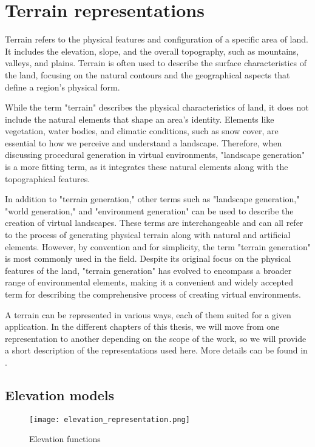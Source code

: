\section{Terrain representations}
Terrain refers to the physical features and configuration of a specific area of land. It includes the elevation, slope, and the overall topography, such as mountains, valleys, and plains. Terrain is often used to describe the surface characteristics of the land, focusing on the natural contours and the geographical aspects that define a region's physical form.

While the term "terrain" describes the physical characteristics of land, it does not include the natural elements that shape an area's identity. Elements like vegetation, water bodies, and climatic conditions, such as snow cover, are essential to how we perceive and understand a landscape. Therefore, when discussing procedural generation in virtual environments, "landscape generation" is a more fitting term, as it integrates these natural elements along with the topographical features.

In addition to "terrain generation," other terms such as "landscape generation," "world generation," and "environment generation" can be used to describe the creation of virtual landscapes. These terms are interchangeable and can all refer to the process of generating physical terrain along with natural and artificial elements. However, by convention and for simplicity, the term "terrain generation" is most commonly used in the field. Despite its original focus on the physical features of the land, "terrain generation" has evolved to encompass a broader range of environmental elements, making it a convenient and widely accepted term for describing the comprehensive process of creating virtual environments.

A terrain can be represented in various ways, each of them suited for a given application. In the different chapters of this thesis, we will move from one representation to another depending on the scope of the work, so we will provide a short description of the representations used here. More details can be found in \cite{Galin2019}.

\subsection{Elevation models}

\begin{figure}[H]
    \centering
    \texttt{[image: elevation\_representation.png]}
    \caption{Elevation functions}
    \label{fig:erosion-elevation-representation}
\end{figure}

